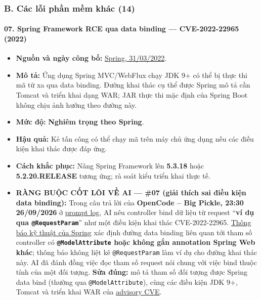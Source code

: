 \subsubsection{B. Các lỗi phần mềm khác (14)}\label{b.-cuxe1c-lux1ed7i-phux1ea7n-mux1ec1m-khuxe1c-14}

\paragraph{07. Spring Framework RCE qua data binding --- CVE-2022-22965 (2022)}\label{spring-framework-rce-qua-data-binding-cve-2022-22965-2022}

\begin{itemize}
\tightlist
\item
  \textbf{Nguồn và ngày công bố:} \href{https://spring.io/security/cve-2022-22965/}{Spring, 31/03/2022}.
\item
  \textbf{Mô tả:} Ứng dụng Spring MVC/WebFlux chạy JDK 9+ có thể bị thực thi mã từ xa qua data binding. Đường khai thác cụ thể được Spring mô tả cần Tomcat và triển khai dạng WAR; JAR thực thi mặc định của Spring Boot không chịu ảnh hưởng theo đường này.
\item
  \textbf{Mức độ:} \textbf{Nghiêm trọng theo Spring}.
\item
  \textbf{Hậu quả:} Kẻ tấn công có thể chạy mã trên máy chủ ứng dụng nếu các điều kiện khai thác được đáp ứng.
\item
  \textbf{Cách khắc phục:} Nâng Spring Framework lên \textbf{5.3.18} hoặc \textbf{5.2.20.RELEASE} tương ứng; rà soát kiểu triển khai thực tế.
\item
  \textbf{RÀNG BUỘC CỐT LÕI VỀ AI --- \#07 (giải thích sai điều kiện data binding):} Trong câu trả lời của \textbf{OpenCode -- Big Pickle, 23:30 26/09/2026} ở \href{Appendix_A_Prompt_Log.md}{prompt log}, AI nêu controller bind dữ liệu từ request ``\textbf{ví dụ qua \texttt{@RequestParam}}'' như một điều kiện khai thác CVE-2022-22965. \href{https://spring.io/blog/2022/03/31/spring-framework-rce-early-announcement/}{Thông báo kỹ thuật của Spring} xác định đường data binding liên quan tới tham số controller có \textbf{\texttt{@ModelAttribute} hoặc không gắn annotation Spring Web khác}; thông báo không liệt kê \texttt{@RequestParam} làm ví dụ cho đường khai thác này. AI đã đánh đồng việc đọc tham số request nói chung với việc bind thuộc tính của một đối tượng. \textbf{Sửa đúng:} mô tả tham số đối tượng được Spring data bind (thường qua \texttt{@ModelAttribute}), cùng các điều kiện JDK 9+, Tomcat và triển khai WAR của \href{https://spring.io/security/cve-2022-22965/}{advisory CVE}.
\end{itemize}

